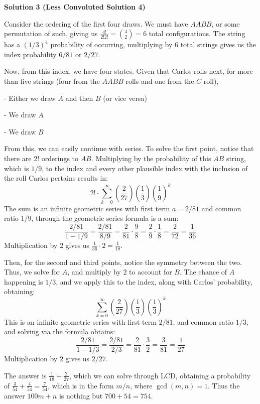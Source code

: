 \begin{enumerate}
 



\textbf{Solution 3 (Less Convoluted Solution 4)}

Consider the ordering of the first four draws. We must have $AABB$, or some permutation of such, giving us $\frac{4!}{2!2!} = \binom{4}{2} = 6$ total configurations. The string has a $(1/3)^4$ probability of occurring, multiplying by $6$ total strings gives us the index probability $6/81$ or $2/27$.

 Now, from this index, we have four states. Given that Carlos rolls next, for more than five strings (four from the $AABB$ rolls and one from the $C$ roll),

 - Either we draw $A$ and then $B$ (or vice versa)

 - We draw $A$

 - We draw $B$

 From this, we can easily continue with series. To solve the first point, notice that there are $2!$ orderings to $AB$. Multiplying by the probability of this $AB$ string, which is $1/9$, to the index and every other plausible index with the inclusion of the roll Carlos pertains results in:
 \[2! \cdot \sum_{k=0}^{\infty} \left(\frac{2}{27}\right)\left(\frac{1}{3}\right)\left(\frac{1}{9}\right)^k\]The sum is an infinite geometric series with first term $a = 2/81$ and common ratio $1/9$, through the geometric series formula is a sum:
 \[\frac{2/81}{1 - 1/9} = \frac{2/81}{8/9} = \frac{2}{81} \cdot \frac{9}{8} = \frac{2}{9} \cdot \frac{1}{8} = \frac{2}{72} = \frac{1}{36}\]Multiplication by $2$ gives us $\frac{1}{36} \cdot 2 = \frac{1}{18}$.

 Then, for the second and third points, notice the symmetry between the two. Thus, we solve for $A$, and multiply by $2$ to account for $B$. The chance of $A$ happening is $1/3$, and we apply this to the index, along with Carlos' probability, obtaining:
 \[\sum_{k=0}^{\infty} \left(\frac{2}{27}\right)\left(\frac{1}{3}\right)\left(\frac{1}{3}\right)^k\]This is an infinite geometric series with first term $2/81$, and common ratio $1/3$, and solving via the formula obtains:
 \[\frac{2/81}{1 - 1/3} = \frac{2/81}{2/3} = \frac{2}{81} \cdot \frac{3}{2} = \frac{3}{81} = \frac{1}{27}\]Multiplication by $2$ gives us $2/27$.

 The answer is $\frac{1}{18} + \frac{2}{27}$, which we can solve through LCD, obtaining a probability of $\frac{3}{54} + \frac{4}{54} = \frac{7}{54}$, which is in the form $m/n$, where $\gcd(m, n) = 1$. Thus the answer $100m + n$ is nothing but $700 + 54 = \boxed{754}$.


\end{enumerate}
